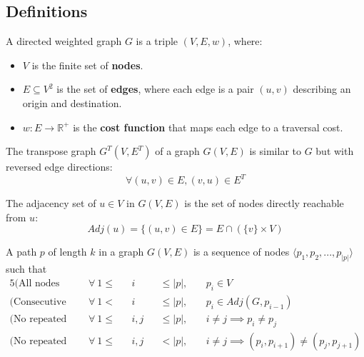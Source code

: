 \subsection{Definitions}
\begin{definition}
    A directed weighted graph $G$ is a triple $(V, E, w)$, where:
    \begin{itemize}
        \item $V$ is the finite set of \textbf{nodes}.
        \item $E \subseteq V^2$ is the set of \textbf{edges}, where each edge is a pair $(u,v)$ describing an origin and destination.
        \item $w: E \rightarrow \mathbb{R}^+$ is the \textbf{cost function} that maps each edge to a traversal cost.
    \end{itemize}
\end{definition}
\begin{definition}
    The transpose graph $G^T(V, E^T)$ of a graph $G(V, E)$ is similar to $G$ but with reversed edge directions:
    \begin{equation*}
        \forall (u, v) \in E, (v, u) \in E^T
    \end{equation*}
\end{definition}
\begin{definition}
    The adjacency set of $u \in V$ in $G(V,E)$ is the set of nodes directly reachable from $u$:
    \begin{equation*}
        Adj(u) = \{(u, v) \in E\} = E \cap (\{v\}\times V)
    \end{equation*}
\end{definition}
\begin{definition}[Path]
    A path $p$ of length $k$ in a graph $G(V,E)$ is a sequence of nodes $\langle p_1,p_2,...,p_{|p|}\rangle$ such that
    \begin{alignat*}{5}
        \text{(All nodes belong to the graph)}       ~~&\forall~1 \leq &&i   &&\leq |p|,&&~p_i \in V \\
        \text{(Consecutive nodes are adjacent)}      ~~&\forall~1 <    &&i   &&\leq |p|,&&~p_i \in Adj(G, p_{i-1})\\
        \text{(No repeated nodes)}                   ~~&\forall~1 \leq &&i,j &&\leq |p|,&&~i\neq j \implies p_i \neq p_j \\
        \text{(No repeated edges)}                   ~~&\forall~1 \leq &&i,j &&<    |p|,&&~i\neq j \implies (p_i,p_{i+1}) \neq (p_j, p_{j+1})
    \end{alignat*}
\end{definition}
